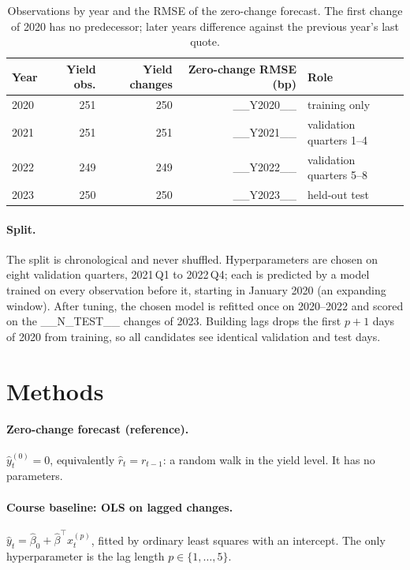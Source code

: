 \documentclass{article}
\begin{document}
\begin{table}[t]
  \caption{Observations by year and the RMSE of the zero-change forecast. The first change of 2020 has no predecessor; later years difference against the previous year's last quote.}
  \label{tab:data}
  \centering
  \begin{tabular}{lrrrl}
    \toprule
    Year & Yield obs. & Yield changes & Zero-change RMSE (bp) & Role\\
    \midrule
    2020 & 251 & 250 & __Y2020__ & training only\\
    2021 & 251 & 251 & __Y2021__ & validation quarters 1--4\\
    2022 & 249 & 249 & __Y2022__ & validation quarters 5--8\\
    2023 & 250 & 250 & __Y2023__ & held-out test\\
    \bottomrule
  \end{tabular}
\end{table}

\paragraph{Split.} The split is chronological and never shuffled. Hyperparameters are chosen on eight validation quarters, 2021\,Q1 to 2022\,Q4; each is predicted by a model trained on every observation before it, starting in January 2020 (an expanding window). After tuning, the chosen model is refitted once on 2020--2022 and scored on the __N_TEST__ changes of 2023. Building lags drops the first $p+1$ days of 2020 from training, so all candidates see identical validation and test days.

\section{Methods}\label{sec:methods}
\paragraph{Zero-change forecast (reference).} $\widehat y_t^{(0)} = 0$, equivalently $\widehat r_t = r_{t-1}$: a random walk in the yield level. It has no parameters.

\paragraph{Course baseline: OLS on lagged changes.} $\widehat y_t = \widehat\beta_0 + \widehat\beta^\top x_t^{(p)}$, fitted by ordinary least squares with an intercept. The only hyperparameter is the lag length $p \in \{1,\dots,5\}$.
\end{document}

